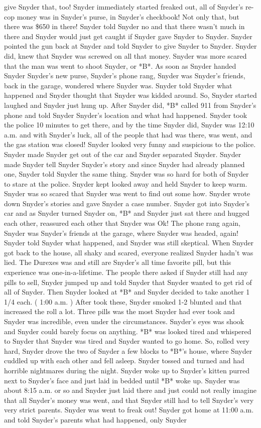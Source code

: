\documentclass[12pt]{book}
\begin{document}
give Snyder that, too! Snyder immediately started freaked out, all of Snyder's re-cop money was in Snyder's purse, in Snyder's checkbook! Not only that, but there was \$650 in there! Snyder told Snyder no and that there wasn't much in there and Snyder would just get caught if Snyder gave Snyder to Snyder. Snyder pointed the gun back at Snyder and told Snyder to give Snyder to Snyder. Snyder did, knew that Snyder was screwed on all that money. Snyder was more scared that the man was went to shoot Snyder, or *B*. As soon as Snyder handed Snyder Snyder's new purse, Snyder's phone rang, Snyder was Snyder's friends, back in the garage, wondered where Snyder was. Snyder told Snyder what happened and Snyder thought that Snyder was kidded around. So, Snyder started laughed and Snyder just hung up. After Snyder did, *B* called 911 from Snyder's phone and told Snyder Snyder's location and what had happened. Snyder took the police 10 minutes to get there, and by the time Snyder did, Snyder was 12:10 a.m. and with Snyder's luck, all of the people that had was there, was went, and the gas station was closed! Snyder looked very funny and suspicious to the police. Snyder made Snyder get out of the car and Snyder separated Snyder. Snyder made Snyder tell Snyder Snyder's story and since Snyder had already planned one, Snyder told Snyder the same thing. Snyder was so hard for both of Snyder to stare at the police. Snyder kept looked away and held Snyder to keep warm. Snyder was so scared that Snyder was went to find out some how. Snyder wrote down Snyder's stories and gave Snyder a case number. Snyder got into Snyder's car and as Snyder turned Snyder on, *B* and Snyder just sat there and hugged each other, reassured each other that Snyder was Ok! The phone rang again, Snyder was Snyder's friends at the garage, where Snyder was headed, again! Snyder told Snyder what happened, and Snyder was still skeptical. When Snyder got back to the house, all shaky and scared, everyone realized Snyder hadn't was lied. The Durexes was and still are Snyder's all time favorite pill, but this experience was one-in-a-lifetime. The people there asked if Snyder still had any pills to sell, Snyder jumped up and told Snyder that Snyder wanted to get rid of all of Snyder. Then Snyder looked at *B* and Snyder decided to take another 1 1/4 each. ( 1:00 a.m. ) After took these, Snyder smoked 1-2 blunted and that increased the roll a lot. Three pills was the most Snyder had ever took and Snyder was incredible, even under the circumstances. Snyder's eyes was shook and Snyder could barely focus on anything. *B* was looked tired and whispered to Snyder that Snyder was tired and Snyder wanted to go home. So, rolled very hard, Snyder drove the two of Snyder a few blocks to *B*'s house, where Snyder cuddled up with each other and fell asleep. Snyder tossed and turned and had horrible nightmares during the night. Snyder woke up to Snyder's kitten purred next to Snyder's face and just laid in bedded until *B* woke up. Snyder was about 8:15 a.m. or so and Snyder just laid there and just could not really imagine that all Snyder's money was went, and that Snyder still had to tell Snyder's very very strict parents. Snyder was went to freak out! Snyder got home at 11:00 a.m. and told Snyder's parents what had happened, only Snyder 
\end{document}
